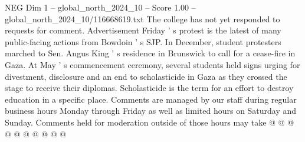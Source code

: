 \begin{textsample}{NEG Dim 1 – global\_north\_2024\_10 – Score 1.00 – global\_north\_2024\_10/116668619.txt}
The college has not yet responded to requests for comment.
Advertisement Friday ' s protest is the latest of many public-facing actions from Bowdoin ' s SJP.
In December, student protesters marched to Sen.
Angus King ' s residence in Brunswick to call for a cease-fire in Gaza.
At May ' s commencement ceremony, several students held signs urging for divestment, disclosure and an end to scholasticide in Gaza as they crossed the stage to receive their diplomas.
Scholasticide is the term for an effort to destroy education in a specific place.
Comments are managed by our staff during regular business hours Monday through Friday as well as limited hours on Saturday and Sunday.
Comments held for moderation outside of those hours may take @ @ @ @ @ @ @ @ @ @

\end{textsample}
